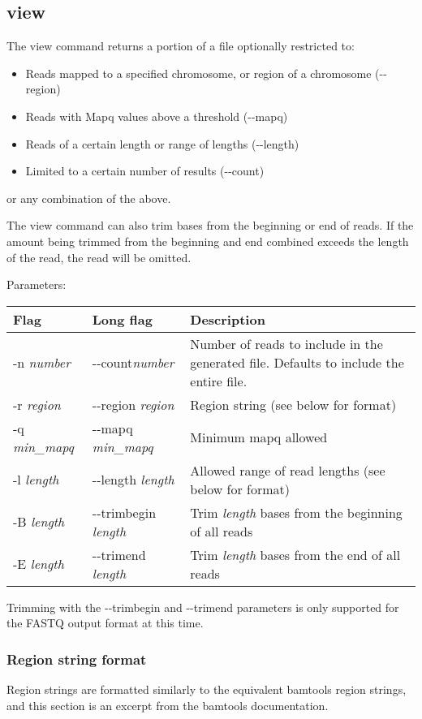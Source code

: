 \documentclass[11pt]{article}
\begin{document}
\subsection{view}
The view command returns a portion of a file optionally restricted to:
\begin{itemize}
\item Reads mapped to a specified chromosome, or region of a chromosome ({-}{-}region)
\item Reads with Mapq values above a threshold ({-}{-}mapq)
\item Reads of a certain length or range of lengths ({-}{-}length)
\item Limited to a certain number of results ({-}{-}count)
\end{itemize}
or any combination of the above.

The view command can also trim bases from the beginning or end of reads. If the amount being trimmed from the beginning and end combined exceeds the length of the read, the read will be omitted.

Parameters:
\begin{center}
\begin{tabular}{llp{3.5in}}
\hline
Flag&Long flag&Description\\ \hline
-n \textit{number}&{-}{-}count\textit{number}&Number of reads to include in the generated file. Defaults to include the entire file.\\
-r \textit{region}&{-}{-}region \textit{region}&Region string (see below for format)\\
-q \textit{min\_mapq}&{-}{-}mapq \textit{min\_mapq}&Minimum mapq allowed\\
-l \textit{length}&{-}{-}length \textit{length}&Allowed range of read lengths (see below for format)\\
-B \textit{length}&{-}{-}trimbegin \textit{length}&Trim \textit{length} bases from the beginning of all reads\\
-E \textit{length}&{-}{-}trimend \textit{length}&Trim \textit{length} bases from the end of all reads\\
\end{tabular}
\end{center}

Trimming with the {-}{-}trimbegin and {-}{-}trimend parameters is only supported for the FASTQ output format at this time.

\subsubsection{Region string format}
Region strings are formatted similarly to the equivalent bamtools region strings, and this section is an excerpt from the bamtools documentation.
\end{document}
